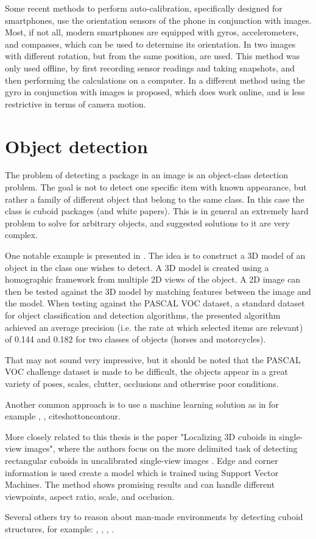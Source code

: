 Some recent methods to perform auto-calibration, specifically designed for smartphones, use the orientation sensors of the phone in conjunction with images.
Most, if not all, modern  smartphones are equipped with gyros, accelerometers, and compasses, which can be used to determine its orientation.
In \cite{saponaro2013towards} two images with different rotation, but from the same position, are used.
This method was only used offline, by first recording sensor readings and taking snapshots, and then performing the calculations on a computer.
In \cite{jia2014online} a different method using the gyro in conjunction with images is proposed, which does work online, and is less restrictive in terms of camera motion.

\section{Object detection}
The problem of detecting a package in an image is an object-class detection problem.
The goal is not to detect one specific item with known appearance, but rather a family of different object that belong to the same class.
In this case the class is cuboid packages (and white papers).
This is in general an extremely hard problem to solve for arbitrary objects, and suggested solutions to it are very complex.

One notable example is presented in \cite{yan20073d}. The idea is to construct a 3D model of an object in the class one wishes to detect.
A 3D model is created using a homographic framework from  multiple 2D views of the object.
A 2D image can then be tested against the 3D model by matching features between the image and the model. 
When testing against the PASCAL VOC dataset, a standard dataset for object classification and detection algorithms, the presented algorithm achieved an average precision (i.e. the rate at which selected items are relevant) of 0.144 and 0.182 for two classes of objects (horses and motorcycles). 

That may not sound very impressive, but it should be noted that the PASCAL VOC challenge dataset is made to be difficult, the objects appear in a great variety of poses, scales, clutter, occlusions and otherwise poor conditions.\cite{everingham2010pascal}

Another common approach is to use a machine learning solution as in for example \cite{viola2001rapid}, \cite{fergus2003object}, cite{shottoncontour}.

More closely related to this thesis is the paper "Localizing 3D cuboids in single-view images", where the authors focus on the more delimited task of detecting rectangular cuboids in uncalibrated single-view images \cite{xiaolocalizing}.
Edge and corner information is used create a model which is trained using Support Vector Machines.
The method shows promising results and can handle different viewpoints, aspect ratio, scale, and occlusion.

Several others try to reason about man-made environments by detecting cuboid structures, for example: \cite{hedau2010thinking}, \cite{hedau2012recovering}, \cite{gupta2010estimating}, \cite{del2012bayesian}.
